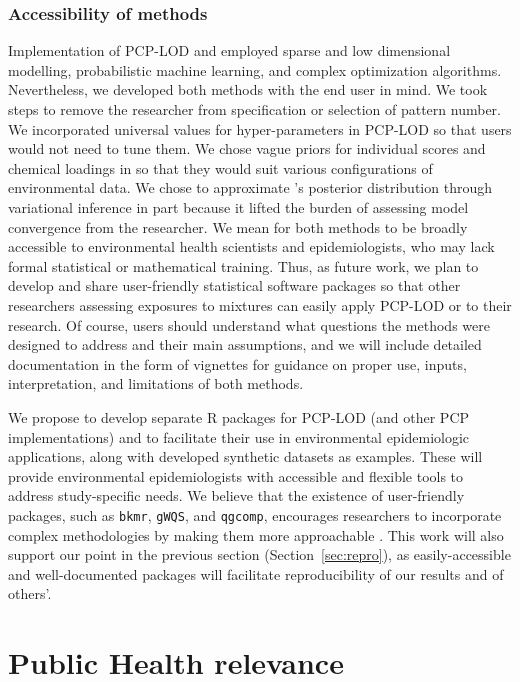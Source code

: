 \subsubsection{Accessibility of methods}\label{diss:access}
Implementation of PCP-LOD and \bnmf employed sparse and low dimensional modelling, probabilistic machine learning, and complex optimization algorithms. Nevertheless, we developed both methods with the end user in mind. We took steps to remove the researcher from specification or selection of pattern number. We incorporated universal values for hyper-parameters in PCP-LOD so that users would not need to tune them. We chose vague priors for individual scores and chemical loadings in \bnmf so that they would suit various configurations of environmental data. We chose to approximate \bnmfc's posterior distribution through variational inference in part because it lifted the burden of assessing model convergence from the researcher. We mean for both methods to be broadly accessible to environmental health scientists and epidemiologists, who may lack formal statistical or mathematical training. Thus, as future work, we plan to develop and share user-friendly statistical software packages so that other researchers assessing exposures to mixtures can easily apply PCP-LOD or \bnmf to their research. Of course, users should understand what questions the methods were designed to address and their main assumptions, and we will include detailed documentation in the form of vignettes for guidance on proper use, inputs, interpretation, and limitations of both methods.

We propose to develop separate R packages for PCP-LOD (and other PCP implementations) and \bnmf to facilitate their use in environmental epidemiologic applications, along with developed synthetic datasets as examples. These will provide environmental epidemiologists with accessible and flexible tools to address study-specific needs. We believe that the existence of user-friendly packages, such as \texttt{bkmr}, \texttt{gWQS}, and \texttt{qgcomp}, encourages researchers to incorporate complex methodologies by making them more approachable \citep{bobb2018statistical, renzetti2016gwqs, keil2020quantile}. This work will also support our point in the previous section (Section~\ref{sec:repro}), as easily-accessible and well-documented packages will facilitate reproducibility of our results and of others'.

\section{Public Health relevance}\label{sec:ph}

